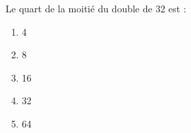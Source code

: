 Le quart de la moitié du double de 32 est :
\begin{multicols}{5}
  \begin{enumerate}[A/]
  \item 4
  \item 8
  \item 16
  \item 32
  \item 64
  \end{enumerate}
\end{multicols}